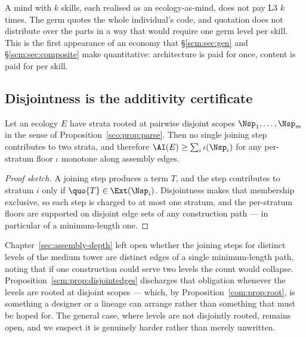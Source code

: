\begin{remark}
\label{scm:rmk:oneg}
A mind with $k$ skills, each realised as an ecology-as-mind, does not pay
L3 $k$ times. The germ quotes the whole individual's code, and quotation
does not distribute over the parts in a way that would require one germ
level per skill. This is the first appearance of an economy that
\S\ref{scm:sec:gen} and \S\ref{scm:sec:composite} make quantitative:
architecture is paid for once, content is paid for per skill.
\end{remark}

\subsection{Disjointness is the additivity certificate}
\label{scm:sec:additive}

\begin{proposition}
\label{scm:prop:disjointedges}
Let an ecology $E$ have strata rooted at pairwise disjoint scopes $\Nsp_1,
\dots, \Nsp_m$ in the sense of Proposition~\ref{sco:prop:parse}. Then no
single joining step contributes to two strata, and therefore
$\AI(E) \ge \sum_i \iota(\Nsp_i)$ for any per-stratum floor $\iota$
monotone along assembly edges.
\end{proposition}

\begin{proof}[Proof sketch]
A joining step produces a term $T$, and the step contributes to stratum
$i$ only if $\quo{T} \in \Ext(\Nsp_i)$. Disjointness makes that membership
exclusive, so each step is charged to at most one stratum, and the
per-stratum floors are supported on disjoint edge sets of any construction
path --- in particular of a minimum-length one.
\end{proof}

\begin{remark}
\label{scm:rmk:obligation}
Chapter~\ref{sec:assembly-depth} left open whether the joining steps for
distinct levels of the medium tower are distinct edges of a single
minimum-length path, noting that if one construction could serve two
levels the count would collapse.
Proposition~\ref{scm:prop:disjointedges} discharges that obligation
whenever the levels are rooted at disjoint scopes --- which, by
Proposition~\ref{com:prop:root}, is something a designer or a lineage can
arrange rather than something that must be hoped for. The general case,
where levels are not disjointly rooted, remains open, and we suspect it is
genuinely harder rather than merely unwritten.
\end{remark}

